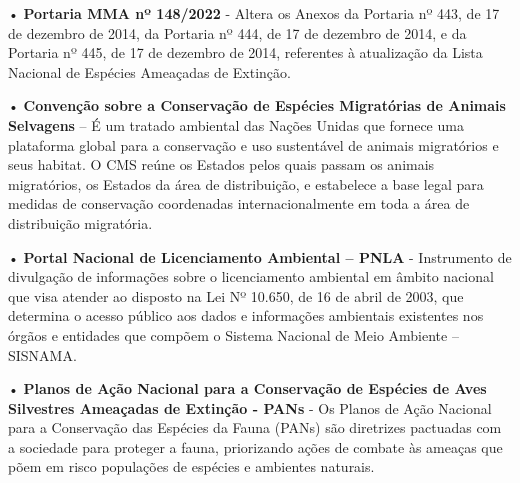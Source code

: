 \documentclass[
  oneside]{scrbook}
\begin{document}
• \textbf{Portaria MMA nº 148/2022} - Altera os Anexos da Portaria nº 443, de 17 de dezembro de 2014, da Portaria nº 444, de 17 de dezembro de 2014, e da Portaria nº 445, de 17 de dezembro de 2014, referentes à atualização da Lista Nacional de Espécies Ameaçadas de Extinção.

• \textbf{Convenção sobre a Conservação de Espécies Migratórias de Animais Selvagens} -- É um tratado ambiental das Nações Unidas que fornece uma plataforma global para a conservação e uso sustentável de animais migratórios e seus habitat. O CMS reúne os Estados pelos quais passam os animais migratórios, os Estados da área de distribuição, e estabelece a base legal para medidas de conservação coordenadas internacionalmente em toda a área de distribuição migratória.

• \textbf{Portal Nacional de Licenciamento Ambiental -- PNLA} - Instrumento de divulgação de informações sobre o licenciamento ambiental em âmbito nacional que visa atender ao disposto na Lei Nº 10.650, de 16 de abril de 2003, que determina o acesso público aos dados e informações ambientais existentes nos órgãos e entidades que compõem o Sistema Nacional de Meio Ambiente -- SISNAMA.

• \textbf{Planos de Ação Nacional para a Conservação de Espécies de Aves Silvestres Ameaçadas de Extinção - PANs} - Os Planos de Ação Nacional para a Conservação das Espécies da Fauna (PANs) são diretrizes pactuadas com a sociedade para proteger a fauna, priorizando ações de combate às ameaças que põem em risco populações de espécies e ambientes naturais.

  
\end{document}
